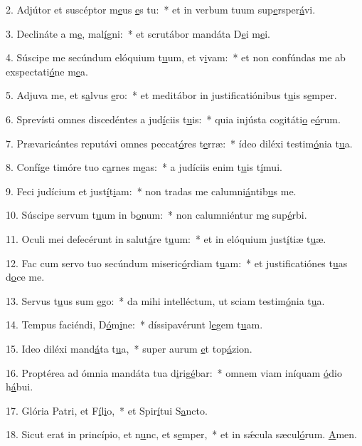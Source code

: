 2. Adjútor et suscéptor m\uline{e}us \uline{e}s tu:~* et in verbum tuum sup\uline{e}rsper\uline{á}vi.\par 
3. Declináte a m\uline{e}, mal\uline{í}gni:~* et scrutábor mandáta D\uline{e}i m\uline{e}i.\par 
4. Súscipe me secúndum elóquium t\uline{u}um, et v\uline{i}vam:~* et non confúndas me ab exspectati\uline{ó}ne m\uline{e}a.\par 
5. Adjuva me, et s\uline{a}lvus \uline{e}ro:~* et meditábor in justificatiónibus t\uline{u}is s\uline{e}mper.\par 
6. Sprevísti omnes discedéntes a jud\uline{í}ciis t\uline{u}is:~* quia injústa cogitáti\uline{o} e\uline{ó}rum.\par 
7. Prævaricántes reputávi omnes peccat\uline{ó}res t\uline{e}rræ:~* ídeo diléxi testim\uline{ó}nia t\uline{u}a.\par 
8. Confíge timóre tuo c\uline{a}rnes m\uline{e}as:~* a judíciis enim t\uline{u}is t\uline{í}mui.\par 
9. Feci judícium et just\uline{í}t\uline{i}am:~* non tradas me calumni\uline{á}ntib\uline{u}s me.\par 
10. Súscipe servum t\uline{u}um in b\uline{o}num:~* non calumniéntur m\uline{e} sup\uline{é}rbi.\par 
11. Oculi mei defecérunt in salut\uline{á}re t\uline{u}um:~* et in elóquium just\uline{í}tiæ t\uline{u}æ.\par 
12. Fac cum servo tuo secúndum miseric\uline{ó}rdiam t\uline{u}am:~* et justificatiónes t\uline{u}as d\uline{o}ce me.\par 
13. Servus t\uline{u}us sum \uline{e}go:~* da mihi intelléctum, ut sciam testim\uline{ó}nia t\uline{u}a.\par 
14. Tempus faciéndi, D\uline{ó}m\uline{i}ne:~* díssipavérunt l\uline{e}gem t\uline{u}am.\par 
15. Ideo diléxi mand\uline{á}ta t\uline{u}a,~* super aurum \uline{e}t top\uline{á}zion.\par 
16. Proptérea ad ómnia mandáta tua d\uline{i}rig\uline{é}bar:~* omnem viam iníquam \uline{ó}dio h\uline{á}bui.\par 
17. Glória Patri, et F\uline{í}l\uline{i}o,~* et Spir\uline{í}tui S\uline{a}ncto.\par 
18. Sicut erat in princípio, et n\uline{u}nc, et s\uline{e}mper,~* et in sǽcula sæcul\uline{ó}rum. \uline{A}men.\par 
